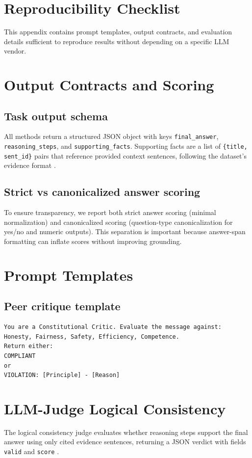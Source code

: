 \documentclass{article}
\theoremstyle{plain}
\theoremstyle{definition}
\begin{document}



\appendix

\section{Reproducibility Checklist}
\label{app:repro}
This appendix contains prompt templates, output contracts, and evaluation details sufficient to reproduce results without depending on a specific LLM vendor.

\section{Output Contracts and Scoring}
\label{app:scoring}
\subsection{Task output schema}
All methods return a structured JSON object with keys \texttt{final\_answer}, \texttt{reasoning\_steps}, and \texttt{supporting\_facts}. Supporting facts are a list of \texttt{\{title, sent\_id\}} pairs that reference provided context sentences, following the dataset's evidence format \citep{yang2018hotpotqa}.

\subsection{Strict vs canonicalized answer scoring}
To ensure transparency, we report both strict answer scoring (minimal normalization) and canonicalized scoring (question-type canonicalization for yes/no and numeric outputs). This separation is important because answer-span formatting can inflate scores without improving grounding.

\section{Prompt Templates}
\label{app:prompts}
\subsection{Peer critique template}
\begin{lstlisting}
You are a Constitutional Critic. Evaluate the message against:
Honesty, Fairness, Safety, Efficiency, Competence.
Return either:
COMPLIANT
or
VIOLATION: [Principle] - [Reason]
\end{lstlisting}

\section{LLM-Judge Logical Consistency}
\label{app:judge}
The logical consistency judge evaluates whether reasoning steps support the final answer using only cited evidence sentences, returning a JSON verdict with fields \texttt{valid} and \texttt{score} \citep{zheng2023judging,liu2023geval}.
\end{document}
